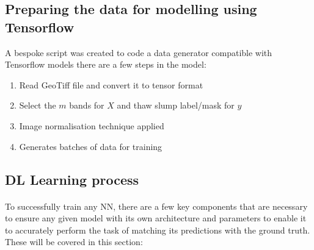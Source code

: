 \subsection{Preparing the data for modelling using Tensorflow} \label{tf_dataprep}
A bespoke script was created to code a data generator compatible with Tensorflow models there are a few steps in the model:

\begin{enumerate}
    \item Read GeoTiff file and convert it to tensor format
    \item Select the $m$ bands for $X$ and thaw slump label/mask for $y$
    \item Image normalisation technique applied
    \item Generates batches of data for training
\end{enumerate}
\subsection{\gls{DL} Learning process} \label{nn_hyperparameters}
\paragraph{}
To successfully train any \gls{NN}, there are a few key components that are necessary to ensure any given model with its own architecture and parameters to enable it to accurately perform the task of matching its predictions with the ground truth. These will be covered in this section:

